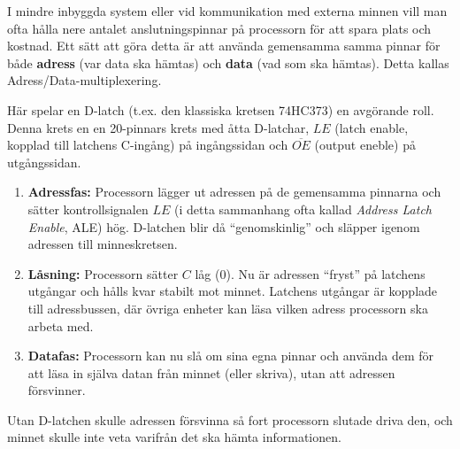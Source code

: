 \documentclass[
  swedish,
  letterpaper,
  oneside,
  openany]{book}
\providecommand{\tightlist}{%
  \setlength{\itemsep}{0pt}\setlength{\parskip}{0pt}}
\begin{document}
\begin{tcolorbox}[enhanced jigsaw, arc=.35mm, bottomrule=.15mm, bottomtitle=1mm, breakable, colback=white, colbacktitle=quarto-callout-note-color!10!white, colframe=quarto-callout-note-color-frame, coltitle=black, left=2mm, leftrule=.75mm, opacityback=0, opacitybacktitle=0.6, rightrule=.15mm, title=\textcolor{quarto-callout-note-color}{\faInfo}\hspace{0.5em}{Praktiskt exempel: Adress-latchning (spara pinnar vid
parallellkommunikation)}, titlerule=0mm, toprule=.15mm, toptitle=1mm]

I mindre inbyggda system eller vid kommunikation med externa minnen vill
man ofta hålla nere antalet anslutningspinnar på processorn för att
spara plats och kostnad. Ett sätt att göra detta är att använda
gemensamma samma pinnar för både \textbf{adress} (var data ska hämtas)
och \textbf{data} (vad som ska hämtas). Detta kallas
Adress/Data-multiplexering.

Här spelar en D-latch (t.ex. den klassiska kretsen 74HC373) en avgörande
roll. Denna krets en en 20-pinnars krets med åtta D-latchar, \(LE\)
(latch enable, kopplad till latchens C-ingång) på ingångssidan och
\(\overline{OE}\) (output eneble) på utgångssidan.

\begin{enumerate}
\def\labelenumi{\arabic{enumi}.}
\tightlist
\item
  \textbf{Adressfas:} Processorn lägger ut adressen på de gemensamma
  pinnarna och sätter kontrollsignalen \(LE\) (i detta sammanhang ofta
  kallad \emph{Address Latch Enable}, ALE) hög. D-latchen blir då
  ``genomskinlig'' och släpper igenom adressen till minneskretsen.
\item
  \textbf{Låsning:} Processorn sätter \(C\) låg (\(0\)). Nu är adressen
  ``fryst'' på latchens utgångar och hålls kvar stabilt mot minnet.
  Latchens utgångar är kopplade till adressbussen, där övriga enheter
  kan läsa vilken adress processorn ska arbeta med.
\item
  \textbf{Datafas:} Processorn kan nu slå om sina egna pinnar och
  använda dem för att läsa in själva datan från minnet (eller skriva),
  utan att adressen försvinner.
\end{enumerate}

Utan D-latchen skulle adressen försvinna så fort processorn slutade
driva den, och minnet skulle inte veta varifrån det ska hämta
informationen.

\end{tcolorbox}
\end{document}
